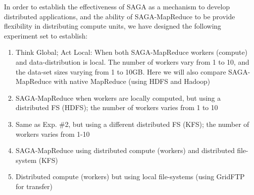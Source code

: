 \documentclass[conference,final]{IEEEtran}
\newcommand{\jhanote}[1]{ {\textcolor{red} { ***SJ: #1 }}}
\newcommand{\jhanote}[1]{}
\newcommand{\sagamapreduce }{SAGA-MapReduce }
\begin{document}




In order to establish the effectiveness of SAGA as a mechanism to
develop distributed applications, and the ability of \sagamapreduce to
be provide flexibility in distributing compute units, we have designed
the following experiment set to establish:
\begin{enumerate}
\item Think Global; Act Local: When both \sagamapreduce workers
  (compute) and data-distribution is local. The number of workers vary
  from 1 to 10, and the data-set sizes varying from 1 to 10GB. Here we
  will also compare \sagamapreduce with native MapReduce (using HDFS
  and Hadoop)
\item \sagamapreduce when workers are locally computed, but using a distributed FS (HDFS); the number of workers varies from 1 to 10
\item Same as Exp. \#2, but using a different distributed FS
  (KFS); the number of workers varies from 1-10
\item \sagamapreduce using distributed compute (workers) and distributed file-system (KFS)
\item Distributed compute (workers) but using local file-systems (using GridFTP for transfer)
\end{enumerate}
\end{document}
